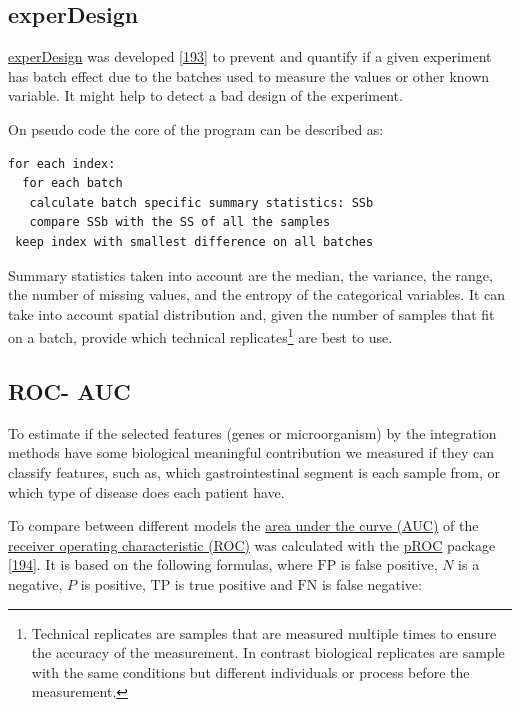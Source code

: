 \documentclass[
  12pt,
  a4paper,
  twoside,
  openright]{book}
\begin{document}
\hypertarget{experdesign}{%
\subsection{experDesign}\label{experdesign}}

\href{https://cran.r-project.org/package=experDesign}{experDesign} was developed {[}\protect\hyperlink{ref-revillasancho2021}{193}{]} to prevent and quantify if a given experiment has batch effect due to the batches used to measure the values or other known variable.
It might help to detect a bad design of the experiment.

On pseudo code the core of the program can be described as:

\hypertarget{pseudocode-experDesign}{%
\label{pseudocode-experDesign}}%
\begin{verbatim}
for each index:
  for each batch
   calculate batch specific summary statistics: SSb
   compare SSb with the SS of all the samples
 keep index with smallest difference on all batches
\end{verbatim}

Summary statistics taken into account are the median, the variance, the range, the number of missing values, and the entropy of the categorical variables.
It can take into account spatial distribution and, given the number of samples that fit on a batch, provide which technical replicates\footnote{Technical replicates are samples that are measured multiple times to ensure the accuracy of the measurement.
  In contrast biological replicates are sample with the same conditions but different individuals or process before the measurement.} are best to use.

\hypertarget{ROC}{%
\subsection{ROC- AUC}\label{ROC}}

To estimate if the selected features (genes or microorganism) by the integration methods have some biological meaningful contribution we measured if they can classify features, such as, which gastrointestinal segment is each sample from, or which type of disease does each patient have.

To compare between different models the \protect\hyperlink{acronyms_AUC}{area under the curve (AUC)} of the \protect\hyperlink{acronyms_ROC}{receiver operating characteristic (ROC)} was calculated with the \href{https://cran.r-project.org/package=pROC}{pROC} package {[}\protect\hyperlink{ref-robin2011}{194}{]}.
It is based on the following formulas, where \(\text{FP}\) is false positive, \(N\) is a negative, \(P\) is positive, \(\text{TP}\) is true positive and \(\text{FN}\) is false negative:
\end{document}
